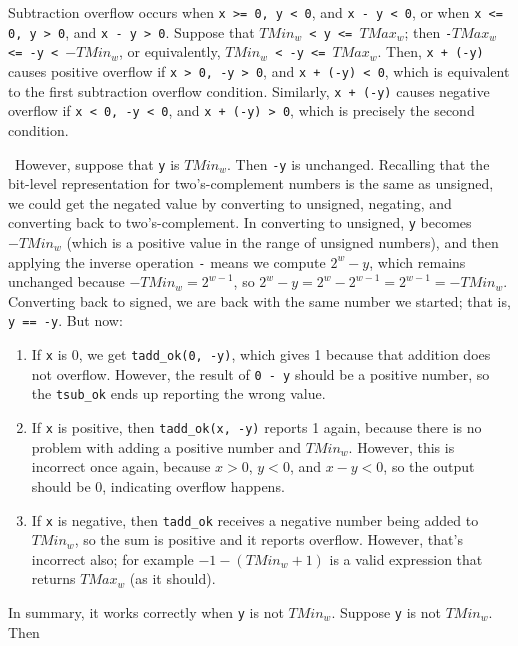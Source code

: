 \documentclass[12pt]{article}
\newenvironment{sol}[1][Solution]{\begin{trivlist}
		\item[\hskip \labelsep {\bfseries #1:}]}{\end{trivlist}}
\begin{document}
\begin{sol}
	Subtraction overflow occurs when \texttt{x >= 0, y < 0}, and \texttt{x - y < 0},
	or when \texttt{x <= 0, y > 0}, and \texttt{x - y > 0}. Suppose that
	\texttt{$TMin_w$ < y <= $TMax_w$}; then \texttt{-$TMax_w$ <= -y < $-TMin_w$}, or
	equivalently, \texttt{$TMin_w$ < -y <= $TMax_w$}. Then, \texttt{x + (-y)} causes
	positive overflow if \texttt{x > 0, -y > 0}, and \texttt{x + (-y) < 0}, which is
	equivalent to the first subtraction overflow condition. Similarly,
	\texttt{x + (-y)} causes negative overflow if \texttt{x < 0, -y < 0}, and \texttt{x + (-y) > 0},
	which is precisely the second condition.
	
	\
	However, suppose that \texttt{y} is $TMin_w$. Then \texttt{-y} is unchanged. Recalling
	that the bit-level representation for two's-complement numbers is the same as
	unsigned, we could get the negated value by converting to unsigned, negating, and
	converting back to two's-complement. In converting to unsigned, \texttt{y} becomes
	$-TMin_w$ (which is a positive value in the range of unsigned numbers), and then
	applying the inverse operation \texttt{-} means we compute $2^w - y$, which remains
	unchanged because $-TMin_w=2^{w-1}$, so $2^w-y=2^w-2^{w-1}=2^{w-1}=-TMin_w$. Converting
	back to signed, we are back with the same number we started; that is,
	\texttt{y == -y}. But now:
	\begin{enumerate}[label=(\roman*)]
		\item If \texttt{x} is 0, we get \texttt{tadd\_ok(0, -y)}, which gives 1 because
		that addition does not overflow. However, the result of \texttt{0 - y} should
		be a positive number, so the \texttt{tsub\_ok} ends up reporting the wrong value.
		\item If \texttt{x} is positive, then \texttt{tadd\_ok(x, -y)} reports 1 again,
		because there is no problem with adding a positive number and $TMin_w$.
		However, this is incorrect once again, because $x>0$, $y<0$, and $x-y < 0$,
		so the output should be 0, indicating overflow happens.
		\item If \texttt{x} is negative, then \texttt{tadd\_ok} receives a negative
		number being added to $TMin_w$, so the sum is positive and it reports
		overflow. However, that's incorrect also; for example $-1 - (TMin_w + 1)$ is a
		valid expression that returns $TMax_w$ (as it should).
	\end{enumerate}
	
	In summary, it works correctly when \texttt{y} is not $TMin_w$.
	Suppose \texttt{y} is not $TMin_w$. Then 
\end{sol}
\end{document}

